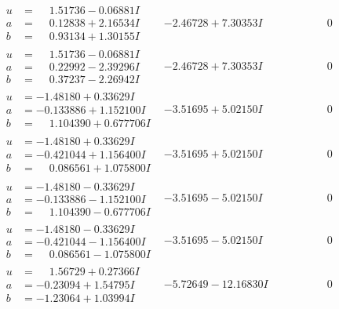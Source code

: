 \documentclass[1p]{elsarticle_modified}
\theoremstyle{definition}
\begin{document}
$$\begin{array}{c|c|c}
\begin{aligned}
u &= \phantom{-}1.51736 - 0.06881 I \\
a &= \phantom{-}0.12838 + 2.16534 I \\
b &= \phantom{-}0.93134 + 1.30155 I\end{aligned}
 & -2.46728 + 7.30353 I & \phantom{-0.000000 } 0 \\ \hline\begin{aligned}
u &= \phantom{-}1.51736 - 0.06881 I \\
a &= \phantom{-}0.22992 - 2.39296 I \\
b &= \phantom{-}0.37237 - 2.26942 I\end{aligned}
 & -2.46728 + 7.30353 I & \phantom{-0.000000 } 0 \\ \hline\begin{aligned}
u &= -1.48180 + 0.33629 I \\
a &= -0.133886 + 1.152100 I \\
b &= \phantom{-}1.104390 + 0.677706 I\end{aligned}
 & -3.51695 + 5.02150 I & \phantom{-0.000000 } 0 \\ \hline\begin{aligned}
u &= -1.48180 + 0.33629 I \\
a &= -0.421044 + 1.156400 I \\
b &= \phantom{-}0.086561 + 1.075800 I\end{aligned}
 & -3.51695 + 5.02150 I & \phantom{-0.000000 } 0 \\ \hline\begin{aligned}
u &= -1.48180 - 0.33629 I \\
a &= -0.133886 - 1.152100 I \\
b &= \phantom{-}1.104390 - 0.677706 I\end{aligned}
 & -3.51695 - 5.02150 I & \phantom{-0.000000 } 0 \\ \hline\begin{aligned}
u &= -1.48180 - 0.33629 I \\
a &= -0.421044 - 1.156400 I \\
b &= \phantom{-}0.086561 - 1.075800 I\end{aligned}
 & -3.51695 - 5.02150 I & \phantom{-0.000000 } 0 \\ \hline\begin{aligned}
u &= \phantom{-}1.56729 + 0.27366 I \\
a &= -0.23094 + 1.54795 I \\
b &= -1.23064 + 1.03994 I\end{aligned}
 & -5.72649 - 12.16830 I & \phantom{-0.000000 } 0 \\ \hline\begin{aligned}

\end{aligned}
\end{array}$$
\end{document}
